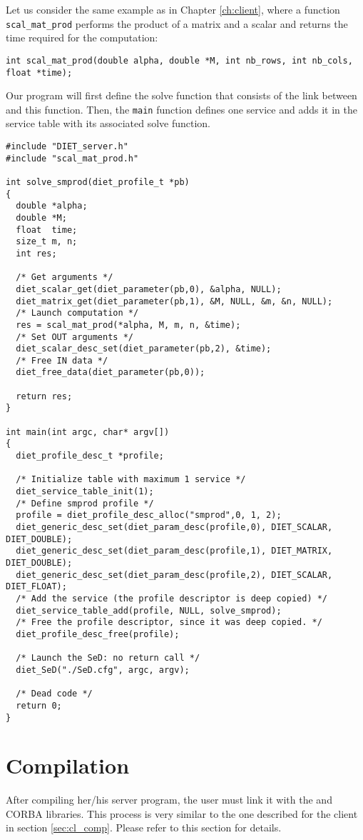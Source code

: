 Let us consider the same example as in Chapter \ref{ch:client}, where
a function \texttt{scal\_mat\_prod} performs the product of a matrix
and a scalar and returns the time required for the computation: {\footnotesize
\begin{verbatim}
int scal_mat_prod(double alpha, double *M, int nb_rows, int nb_cols, float *time);
\end{verbatim}
}
Our program will first define the solve function that consists of the link
between \diet and this function. Then, the \texttt{main} function defines one service and
adds it in the service table with its associated solve function.
{\footnotesize
\begin{verbatim}
#include "DIET_server.h"
#include "scal_mat_prod.h"

int solve_smprod(diet_profile_t *pb)
{
  double *alpha;
  double *M;
  float  time;
  size_t m, n;
  int res;

  /* Get arguments */
  diet_scalar_get(diet_parameter(pb,0), &alpha, NULL);
  diet_matrix_get(diet_parameter(pb,1), &M, NULL, &m, &n, NULL);
  /* Launch computation */
  res = scal_mat_prod(*alpha, M, m, n, &time);
  /* Set OUT arguments */
  diet_scalar_desc_set(diet_parameter(pb,2), &time);
  /* Free IN data */
  diet_free_data(diet_parameter(pb,0));

  return res;
}

int main(int argc, char* argv[])
{
  diet_profile_desc_t *profile;
  
  /* Initialize table with maximum 1 service */
  diet_service_table_init(1);
  /* Define smprod profile */
  profile = diet_profile_desc_alloc("smprod",0, 1, 2);
  diet_generic_desc_set(diet_param_desc(profile,0), DIET_SCALAR, DIET_DOUBLE);
  diet_generic_desc_set(diet_param_desc(profile,1), DIET_MATRIX, DIET_DOUBLE);
  diet_generic_desc_set(diet_param_desc(profile,2), DIET_SCALAR, DIET_FLOAT);
  /* Add the service (the profile descriptor is deep copied) */
  diet_service_table_add(profile, NULL, solve_smprod);
  /* Free the profile descriptor, since it was deep copied. */
  diet_profile_desc_free(profile);

  /* Launch the SeD: no return call */
  diet_SeD("./SeD.cfg", argc, argv);

  /* Dead code */
  return 0;
}
\end{verbatim}
}

\section{Compilation}
\label{sec:sv_comp}

After compiling her/his server program, the user must link it with the \diet
and CORBA libraries. This process is very similar to the one described
for the client in section \ref{sec:cl_comp}. Please refer to this section
for details.

